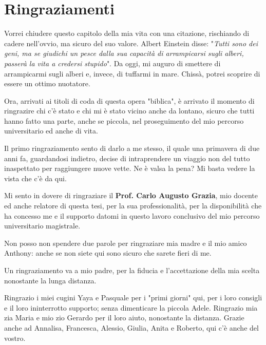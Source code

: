 \chapter*{Ringraziamenti} %
Vorrei chiudere questo capitolo della mia vita con una citazione, rischiando di cadere nell'ovvio, ma sicuro del suo valore. Albert Einstein disse: "\textit{Tutti sono dei geni, ma se giudichi un pesce dalla sua capacità di arrampicarsi sugli alberi, passerà la vita a credersi stupido}". Da oggi, mi auguro di smettere di arrampicarmi sugli alberi e, invece, di tuffarmi in mare. Chissà, potrei scoprire di essere un ottimo nuotatore.

Ora, arrivati ai titoli di coda di questa opera "biblica", è arrivato il momento di ringrazire chi c'è stato e chi mi è stato vicino anche da lontano, sicuro che tutti hanno fatto una parte, anche se piccola, nel proseguimento del mio percorso universitario ed anche di vita.

Il primo ringraziamento sento di darlo a me stesso, il quale una primavera di due anni fa, guardandosi indietro, decise di intraprendere un viaggio non del tutto inaspettato per raggiungere nuove vette. Ne è valsa la pena? Mi basta vedere la vista che c'è da qui.

Mi sento in dovere di ringraziare  il \textbf{Prof. Carlo Augusto Grazia}, mio docente ed anche relatore di questa tesi, per la sua professionalità, per la disponibilità che ha concesso me e il supporto datomi in questo lavoro conclusivo del mio percorso universitario magistrale. 

Non posso non spendere due parole per ringraziare mia madre e il mio amico Anthony: anche se non siete qui sono sicuro che sarete fieri di me.

Un ringraziamento va a mio padre, per la fiducia e l'accettazione della mia scelta nonostante la lunga distanza.

Ringrazio i miei cugini Yaya e Pasquale per i "primi giorni" qui, per i loro consigli e il loro ininterrotto supporto; senza dimenticare la piccola Adele. Ringrazio mia zia Maria e mio zio Gerardo per il loro aiuto, nonostante la distanza. Grazie anche ad Annalisa, Francesca, Alessio, Giulia, Anita e Roberto, qui c'è anche del vostro.


